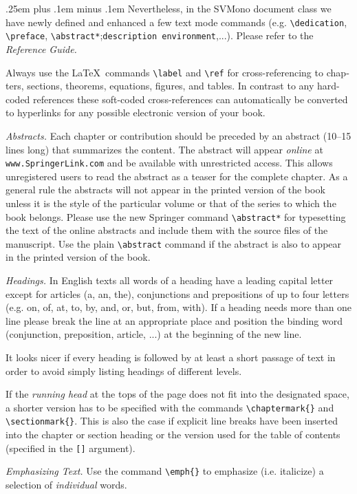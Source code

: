 \documentclass[graybox]{svmono}
\begin{document}
{\spaceskip .25em plus .1em minus .1em Nevertheless, in the {\sc SVMono} document class we have newly defined and en­hanced a few text mode commands (e.g. \verb|\dedication|, \verb|\preface|, \verb|\abstract*|;\break \verb|description environment|,...). Please refer to the {\it Reference Guide.}}

Always use the \LaTeX~commands \verb|\label| and \verb|\ref| for cross-referencing to chap­ters, sections, theorems, equations, figures, and tables. In contrast to any hard-coded references these soft-coded cross-references can automatically be con­verted to hyperlinks for any possible electronic version of your book.

{\it Abstracts.} Each chapter or contribution should be preceded by an abstract (10--15 lines long) that summarizes the content. The abstract will appear {\it online} at {\tt www.SpringerLink.com} and be available with unrestricted access. This allows unregistered users to read the abstract as a teaser for the complete chapter. As a general rule the abstracts will not appear in the printed version of the book unless it is the style of the particular volume or that of the series to which the book belongs. Please use the new Springer command \verb|\abstract*| for typesetting the text of the online abstracts and include them with the source files of the manuscript. Use the plain \verb|\abstract| command if the abstract is also to appear in the printed version of the book.

{\it Headings.} In English texts all words of a heading have a leading capital letter except for articles (a, an, the), conjunctions and prepositions of up to four letters (e.g. on, of, at, to, by, and, or, but, from, with). If a heading needs more than one line please break the line at an appropriate place and position the binding word (conjunction, preposition, article, ...) at the beginning of the new line.

It looks nicer if every heading is followed by at least a short passage of text in order to avoid simply listing headings of different levels.

If the {\it running head} at the tops of the page does not fit into the designated space, a shorter version has to be specified with the commands \verb|\chaptermark{}| and \verb|\sectionmark{}|. This is also the case if explicit line breaks have been inserted into the chapter or section heading or the version used for the table of contents (specified in the \verb|[]| argument).

{\it Emphasizing Text.} Use the command \verb|\emph{}| to emphasize (i.e. italicize) a selection of {\it individual} words.
\end{document}

